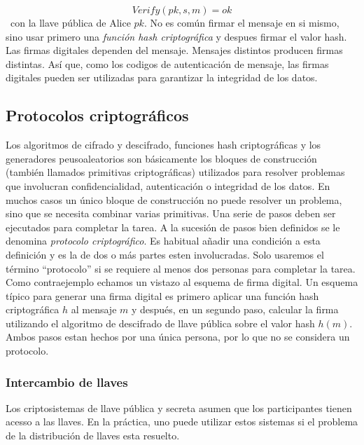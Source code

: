 \documentclass[12pt]{article}
\theoremstyle{definition}
\begin{document}
$$Verify(pk,s,m)=ok$$
\ 
con la llave pública de Alice $pk$.
\newline
No es común firmar el mensaje en si mismo, sino usar primero una \textit{función hash criptográfica} y despues firmar el valor hash. Las firmas digitales dependen del mensaje. Mensajes distintos producen firmas distintas. Así que, como los codigos de autenticación de mensaje, las firmas digitales pueden ser utilizadas para garantizar la integridad de los datos.


\subsection{Protocolos criptográficos}

Los algoritmos de cifrado y descifrado, funciones hash criptográficas y los generadores peusoaleatorios son básicamente los bloques de construcción (también llamados primitivas criptográficas) utilizados para resolver problemas que involucran confidencialidad, autenticación o integridad de los datos.
\newline
\newline
En muchos casos un único bloque de construcción no puede resolver un problema, sino que se necesita combinar varias primitivas. Una serie de pasos deben ser ejecutados para completar la tarea. A la sucesión de pasos bien definidos se le denomina \textit{protocolo criptográfico}. Es habitual añadir una condición a esta definición y es la de dos o más partes esten involucradas. Solo usaremos el término ``protocolo'' si se requiere al menos dos personas para completar la tarea.
\newline
\newline
Como contraejemplo echamos un vistazo al esquema de firma digital. Un esquema típico para generar una firma digital es primero aplicar una función hash criptográfica $h$ al mensaje $m$ y después, en un segundo paso, calcular la firma utilizando el algoritmo de descifrado de llave pública sobre el valor hash $h(m)$. Ambos pasos estan hechos por una única persona, por lo que no se considera un protocolo.

\subsubsection{Intercambio de llaves}
Los criptosistemas de llave pública y secreta asumen que los participantes tienen acesso a las llaves. En la práctica, uno puede utilizar estos sistemas si el problema de la distribución de llaves esta resuelto.
\end{document}
